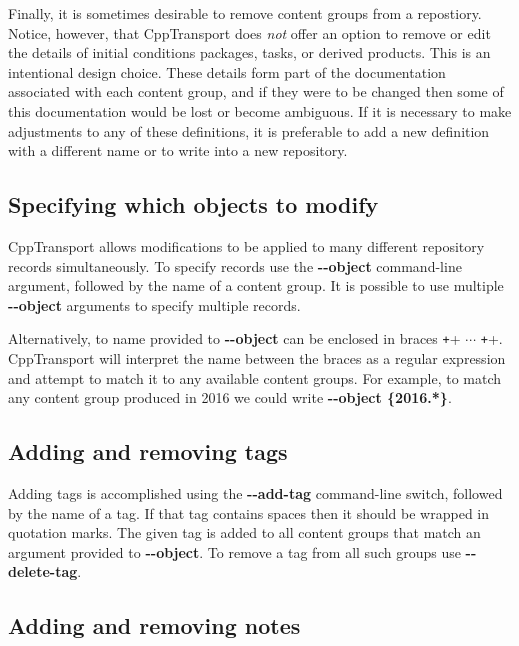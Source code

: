 \documentclass[11pt,a4paper]{article}
\newcommand{\packagefont}{\sffamily}
\newcommand{\CppTransport}{{\packagefont CppTransport}}
\newcommand{\option}[1]{{\ttfamily\bfseries\small #1}}
\begin{document}
Finally, it is sometimes desirable to remove content groups from a repostiory.
Notice, however, that {\CppTransport} does \emph{not} offer an option to remove
or edit
the details of initial conditions packages, tasks, or derived products.
This is an intentional design choice.
These details form part of the documentation associated with each content group,
and if they were to be changed then some of this documentation would be lost
or become ambiguous.
If it is necessary to make adjustments to any of these definitions, it is
preferable to add a new definition with a different name or to write into a new
repository.

\subsection{Specifying which objects to modify}
\label{sec:specify-objects}
{\CppTransport} allows modifications to be applied to many different
repository records simultaneously.
To specify records use the \option{{-}{-}object} command-line argument,
followed by the name of a content group.
It is possible to use multiple \option{{-}{-}object} arguments to specify
multiple records.

Alternatively, to name provided to \option{{-}{-}object} can be
enclosed in braces
\texttt+{+
$\cdots$
\texttt+}+.
{\CppTransport} will interpret the name between the braces
as a regular expression and attempt to match it to any available content groups.
For example, to match any content group produced in 2016 we could write
\option{{-}{-}object \{2016.*\}}.

\subsection{Adding and removing tags}
\label{sec:add-remove-tags}

Adding tags is accomplished using the
\option{{-}{-}add-tag} command-line switch,
followed by the name of a tag. If that tag contains spaces then it should be
wrapped in quotation marks.
The given tag is added to all content groups that match
an argument provided to \option{{-}{-}object}.
To remove a tag from all such groups use
\option{{-}{-}delete-tag}.

\subsection{Adding and removing notes}
\label{sec:add-remove-notes}
\end{document}
